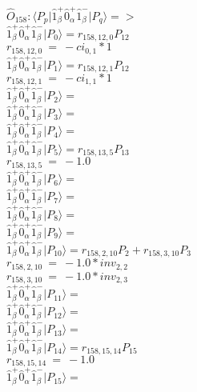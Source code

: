 \documentclass[14pt]{article}
\begin{document}
    $\hat{O}_{158}:  \langle{P_p}\vert \hat{1}_{\beta}^{+}\hat{0}_{\alpha}^{+}\hat{1}_{\beta}^{-} \vert{P_q}\rangle => $ \\ 
    $ \hat{1}_{\beta}^{+}\hat{0}_{\alpha}^{+}\hat{1}_{\beta}^{-} \vert{P_{0}}\rangle = {r}_{158,12,0}P_{12} $ \\ 
    ${r}_{158,12,0}\ =\ -{ci}_{0,1}*1 $ \\ 
    $ \hat{1}_{\beta}^{+}\hat{0}_{\alpha}^{+}\hat{1}_{\beta}^{-} \vert{P_{1}}\rangle = {r}_{158,12,1}P_{12} $ \\ 
    ${r}_{158,12,1}\ =\ -{ci}_{1,1}*1 $ \\ 
    $ \hat{1}_{\beta}^{+}\hat{0}_{\alpha}^{+}\hat{1}_{\beta}^{-} \vert{P_{2}}\rangle =  $ \\ 
    $ \hat{1}_{\beta}^{+}\hat{0}_{\alpha}^{+}\hat{1}_{\beta}^{-} \vert{P_{3}}\rangle =  $ \\ 
    $ \hat{1}_{\beta}^{+}\hat{0}_{\alpha}^{+}\hat{1}_{\beta}^{-} \vert{P_{4}}\rangle =  $ \\ 
    $ \hat{1}_{\beta}^{+}\hat{0}_{\alpha}^{+}\hat{1}_{\beta}^{-} \vert{P_{5}}\rangle = {r}_{158,13,5}P_{13} $ \\ 
    ${r}_{158,13,5}\ =\ -1.0 $ \\ 
    $ \hat{1}_{\beta}^{+}\hat{0}_{\alpha}^{+}\hat{1}_{\beta}^{-} \vert{P_{6}}\rangle =  $ \\ 
    $ \hat{1}_{\beta}^{+}\hat{0}_{\alpha}^{+}\hat{1}_{\beta}^{-} \vert{P_{7}}\rangle =  $ \\ 
    $ \hat{1}_{\beta}^{+}\hat{0}_{\alpha}^{+}\hat{1}_{\beta}^{-} \vert{P_{8}}\rangle =  $ \\ 
    $ \hat{1}_{\beta}^{+}\hat{0}_{\alpha}^{+}\hat{1}_{\beta}^{-} \vert{P_{9}}\rangle =  $ \\ 
    $ \hat{1}_{\beta}^{+}\hat{0}_{\alpha}^{+}\hat{1}_{\beta}^{-} \vert{P_{10}}\rangle = {r}_{158,2,10}P_{2}+{r}_{158,3,10}P_{3} $ \\ 
    ${r}_{158,2,10}\ =\ -1.0*{inv}_{2,2} $ \\ 
    ${r}_{158,3,10}\ =\ -1.0*{inv}_{2,3} $ \\ 
    $ \hat{1}_{\beta}^{+}\hat{0}_{\alpha}^{+}\hat{1}_{\beta}^{-} \vert{P_{11}}\rangle =  $ \\ 
    $ \hat{1}_{\beta}^{+}\hat{0}_{\alpha}^{+}\hat{1}_{\beta}^{-} \vert{P_{12}}\rangle =  $ \\ 
    $ \hat{1}_{\beta}^{+}\hat{0}_{\alpha}^{+}\hat{1}_{\beta}^{-} \vert{P_{13}}\rangle =  $ \\ 
    $ \hat{1}_{\beta}^{+}\hat{0}_{\alpha}^{+}\hat{1}_{\beta}^{-} \vert{P_{14}}\rangle = {r}_{158,15,14}P_{15} $ \\ 
    ${r}_{158,15,14}\ =\ -1.0 $ \\ 
    $ \hat{1}_{\beta}^{+}\hat{0}_{\alpha}^{+}\hat{1}_{\beta}^{-} \vert{P_{15}}\rangle =  $ \\ 
    
\end{document}
